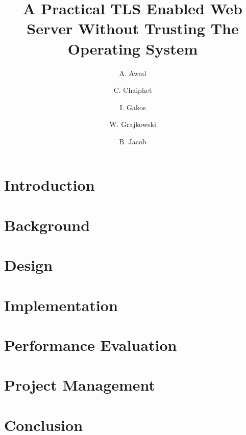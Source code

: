 \documentclass{article}
\title{A Practical TLS Enabled Web Server Without Trusting The Operating
System}
\author{
  A. Awad \and
  C. Chaiphet \and
  I. Gakos \and
  W. Grajkowski \and
  B. Jacob
}
\begin{document}
\maketitle
{}
\newpage

\begin{abstract}
  
\end{abstract}


\newpage

\tableofcontents

\newpage
{}

\section{Introduction}

\newpage

\section{Background}
\label{sec:background}

\newpage

\section{Design}
\label{sec:design}

\newpage

\section{Implementation}
\label{sec:implementation}
 
\newpage

\section{Performance Evaluation}
\label{sec:perfeval}

\newpage

\section{Project Management}
\label{sec:projectmgmt}

\newpage

\section{Conclusion}
\label{sec:conclusion}

\newpage

\printbibliography
\end{document}
